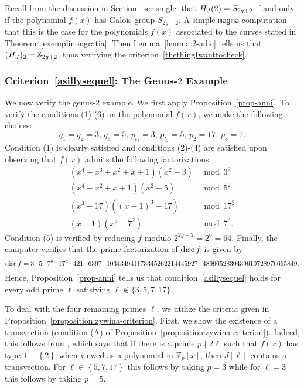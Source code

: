 Recall from the discussion in Section~\ref{sec:single} that $H_J(2) = S_{2g+2}$ if and only if the polynomial $f(x)$ has Galois group $S_{2g+2}$. A simple {\tt magma} computation that this is the case for the polynomials $f(x)$ associated to the curves stated in Theorem~\ref{exemplinongratia}.
Then Lemma~\ref{lemma:2-adic} tells us that $(H_J)_2 = \mathcal S_{2g+2}$, thus verifying the criterion~\eqref{thethingIwanttocheck}. 

\subsubsection{Criterion~\eqref{asillysequel}: The Genus-$2$ Example}

We now verify the genus-$2$ example. We first apply Proposition~\ref{prop-anni}. To verify the conditions (1)-(6) on the polynomial $f(x)$, we make the following choices:
$$q_1 = q_2 = 3,\, q_3 = 5,\, p_{t_1} = 3,\, p_{t_2} = 5,\, p_2 = 17,\, p_3 = 7.$$ 
Condition (1) is clearly satisfied and
conditions (2)-(4) are satisfied upon observing that $f(x)$ admits the following factorizations:
\begin{align*}
( x^4 + x^3 + x^2 + x + 1 )( x^2 - 3 ) & \bmod 3^2 \\
	( x^4 + x^2 + x + 1 )( x^2 - 5 ) & \bmod 5^2 \\
	( x^3 - 17 ) ( ( x-1 )^3 - 17 ) & \bmod 17^2 \\
	( x-1 )( x^5 - 7^2 ) & \bmod 7^3.
\end{align*}
Condition (5) is verified by reducing $f$ modulo $2^{2g+2} = 2^6 = 64$.
Finally, the computer verifies that the prime factorization of $\operatorname{disc} f$ is given by
\begin{equation*}
	\operatorname{disc} f = 3 \cdot 5 \cdot 7^8 \cdot 17^4 \cdot 421 \cdot 6397 \cdot 103434941173345262214445927 \cdot 4899652830439610728976665849.
	\end{equation*}
Hence, Proposition~\ref{prop-anni} tells us that condition~\eqref{asillysequel} holds for every odd prime $\ell$ satisfying $\ell \not\in \{3,5,7,17\}$.

To deal with the four remaining primes $\ell$, we utilize the criteria given in Proposition~\ref{proposition:zywina-criterion}. 
First, we show the existence of a transvection (condition (A) of Proposition~\ref{proposition:zywina-criterion}). 
Indeed, this follows from \cite[Lemma 2.9]{anni2017constructing}, which says that if there is a prime $p \nmid 2 \ell$ such that $f(x)$ has type $1 - \left\{ 2 \right\}$ when viewed as a polynomial in $\mathbb Z_p[x]$, then $J[\ell]$ contains a transvection.
For $\ell \in \left\{ 5,7,17 \right\}$ this follows by taking $p = 3$ while for $\ell =3$ this follows by taking $p = 5$.

